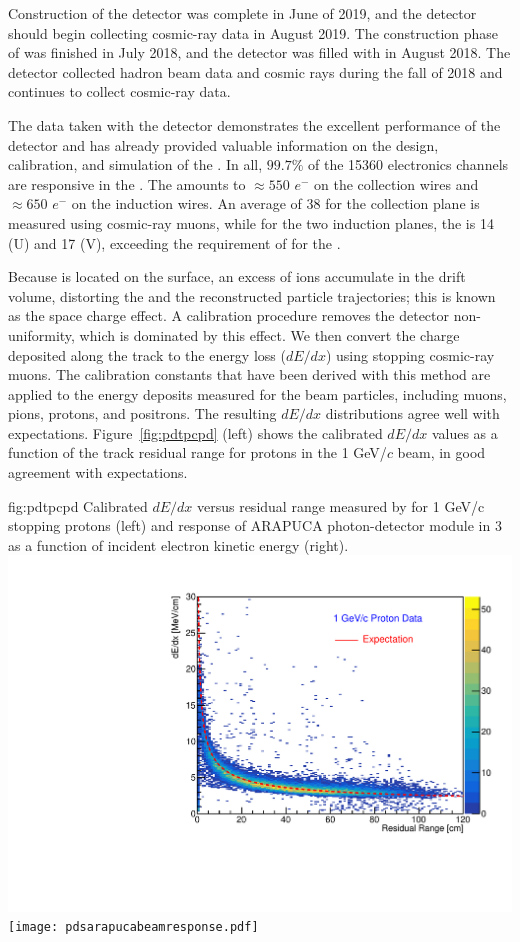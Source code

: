  Construction of the  detector was complete in June of 2019, and the detector should begin collecting cosmic-ray data in August 2019. The construction phase of  was finished in July 2018, and the detector was filled with  in August 2018. The detector collected hadron beam data and cosmic rays during the fall of 2018 and continues to collect cosmic-ray data.

The data taken with the  detector demonstrates the excellent performance of the detector and has already provided valuable information on the design, calibration, and simulation of the  . In all, $99.7\%$ of the 15360  electronics channels are responsive in the . The  amounts to $\approx 550$ $e^{-}$ on the collection wires and $\approx 650$ $e^{-}$ on the induction wires. An average  of 38 for the collection plane is measured using cosmic-ray muons, while for the two induction planes, the  is 14 (U) and 17 (V), exceeding the requirement of %
for the  . 


Because  is located on the surface,  an excess of ions accumulate in the drift volume, %
distorting the \efield and the reconstructed particle trajectories; this is known as the space charge effect. %
A calibration procedure removes the detector non-uniformity, which is dominated by this effect. %
We then convert the charge deposited along the track to the energy loss ($dE/dx$) using stopping cosmic-ray muons. The calibration constants that have been derived with this method are applied to the energy deposits measured for the beam particles, including muons, pions, protons, and positrons.
The resulting $dE/dx$ distributions agree well with expectations.  Figure~\ref{fig:pdtpcpd} (left) shows the calibrated $dE/dx$ values as a function of the track residual range for protons in the 1 GeV/$c$ beam, in good agreement with expectations. 

\begin{dunefigure}
{fig:pdtpcpd}
{Calibrated $dE/dx$ versus residual range measured by  for 1 GeV/c stopping protons (left) and response of ARAPUCA photon-detector module in 3 as a function of incident electron kinetic energy (right).} \includegraphics[width=0.47\linewidth]{graphics/dedx_rr_data_v5.pdf}
\texttt{[image: pdsarapucabeamresponse.pdf]}
\end{dunefigure}


